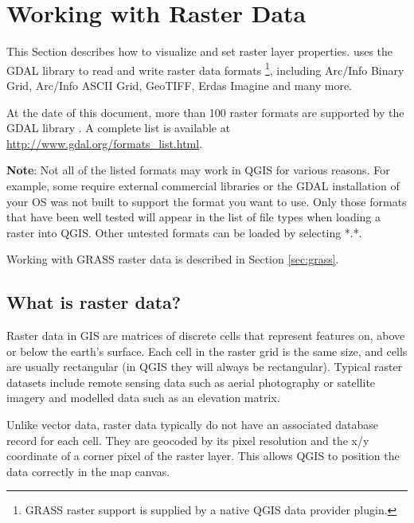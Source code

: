 
\chapter{Working with Raster Data}\label{label_raster}


This Section describes how to visualize and set raster layer properties.
\qg uses the GDAL library to read and write raster data formats
\footnote{GRASS raster support is supplied by a native QGIS data provider 
plugin.}, including Arc/Info Binary Grid, 
Arc/Info ASCII Grid, GeoTIFF,
Erdas Imagine and many more. 

At the date of this document, more than 100 raster formats are supported 
by the GDAL library \cite{GDALweb}. A complete list is available at 
\url{http://www.gdal.org/formats_list.html}.

\textbf{Note}: Not all of the listed formats may work in QGIS for various 
reasons. For example, some require external commercial libraries or 
the GDAL installation of your OS was not built to support the format you want
to use. Only those formats that have been well tested will appear in the list
of file types when loading a raster into QGIS. Other untested formats can 
be loaded by selecting *.*.

Working with GRASS raster data is described in Section \ref{sec:grass}.

\section{What is raster data?}\label{label_whatsraster}

Raster data in GIS are matrices of discrete cells that represent features on,
above or below the earth's surface. Each cell in the raster grid is the same
size, and cells are usually rectangular (in QGIS they will always be
rectangular). Typical raster datasets include remote sensing data such as
aerial photography or satellite imagery and modelled data such as an elevation
matrix.

Unlike vector data, raster data typically do not have an associated database
record for each cell. They are geocoded by its pixel resolution and the x/y
coordinate of a corner pixel of the raster layer. This allows QGIS to position
the data correctly in the map canvas.


